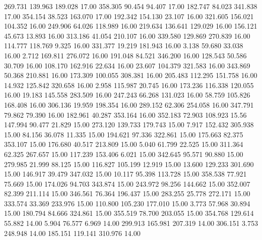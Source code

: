  269.731  139.963  189.028        17.00
 358.305   90.454   94.407        17.00
 182.747   84.023  341.838        17.00
 354.154   38.523  163.070        17.00
 192.342  154.130   23.107        16.00
 321.605  156.021  104.352        16.00
 249.906   64.026  118.989        16.00
 219.634  136.641  129.029        16.00
 156.121   45.673   13.893        16.00
 313.186   41.054  210.107        16.00
 339.580  129.869  270.839        16.00
 114.777  118.769    9.325        16.00
 331.377   19.219  181.943        16.00
   3.138   59.680   33.038        16.00
   2.712  169.811  276.072        16.00
 191.048   84.521  346.200        16.00
 128.543   50.586   30.709        16.00
 108.170  162.916   22.634        16.00
  23.607  104.379  321.583        16.00
 343.869   50.368  210.881        16.00
 173.309  100.055  308.381        16.00
 205.483  112.295  151.758        16.00
  14.932  125.842  320.658        16.00
   2.958  115.987   20.745        16.00
 173.236  116.338  120.055        16.00
  19.183  145.558  283.509        16.00
 247.243   66.268  131.023        16.00
  58.759  105.826  168.408        16.00
 306.136   19.959  198.354        16.00
 289.152   62.306  254.058        16.00
 347.791   79.862   79.390        16.00
 182.961   40.287  353.164        16.00
 352.183   72.903  108.923        15.56
 147.994   90.477   21.829        15.00
 273.120  139.733  179.743        15.00
   7.917  152.432  305.938        15.00
  84.156   36.078   11.335        15.00
 194.621   97.336  322.861        15.00
 175.663   82.375  353.107        15.00
 176.680   40.517  213.809        15.00
   5.040   61.799   22.525        15.00
 311.364   62.325  267.657        15.00
 117.239  153.406    6.021        15.00
 342.645   95.571   90.880        15.00
 279.985   21.999   88.125        15.00
 116.827  105.199   12.919        15.00
  13.600  129.233  301.690        15.00
 146.917   39.479  347.032        15.00
  10.117   95.398  113.728        15.00
 358.538   77.921   75.669        15.00
 174.026   94.703  343.874        15.00
 243.972   98.256  144.662        15.00
 352.007   82.399  211.114        15.00
 346.561   76.364  196.437        15.00
 283.255   25.778  272.171        15.00
 333.574   33.369  233.976        15.00
 110.800  105.230  177.010        15.00
   3.773   57.968   30.894        15.00
 180.794   84.666  324.861        15.00
 355.519   78.700  203.055        15.00
 354.768  129.614   55.882        14.00
   5.904   76.577    6.969        14.00
 299.913  165.981  207.319        14.00
 306.151    3.753  248.948        14.00
 185.151  119.141  310.976        14.00
